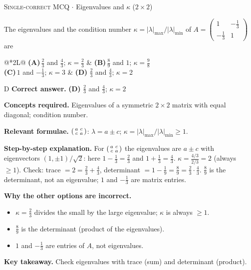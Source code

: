 \documentclass[11pt,a4paper]{article}
\newcommand{\optlabel}[1]{\textbf{(#1)}}
\newcommand{\correctlabel}[1]{\textcolor{okgreen}{\textbf{(#1)}\,\ding{51}}}
\newenvironment{qitem}[1]{\begin{list}{}{\setlength{\leftmargin}{3.3em}\setlength{\labelwidth}{3.1em}%
  \setlength{\labelsep}{0.2em}\setlength{\topsep}{3pt}\setlength{\parsep}{3pt}}\item[\textbf{Q.#1}\hfill]}{\end{list}}
\newcommand{\qsep}{\par\vspace{2pt}{\color{black!15}\hrule}\vspace{4pt}}
\newcommand{\qmeta}[2]{{\footnotesize\color{black!60}\textsc{#1} \;$\cdot$\; #2}\par}
\begin{document}
\begin{qitem}{2}
\qmeta{Single-correct MCQ}{Eigenvalues and $\kappa$ ($2\times2$)}
The eigenvalues and the condition number $\kappa = |\lambda|_{\max}/|\lambda|_{\min}$ of $A = \begin{pmatrix}1 & -\tfrac13\\ -\tfrac13 & 1\end{pmatrix}$ are
\par\smallskip\noindent\begin{tabularx}{\linewidth}{@{}*{2}{L}@{}}
\optlabel{A}\,$\tfrac23$ and $\tfrac43$; $\kappa = \tfrac23$ & \optlabel{B}\,$\tfrac89$ and $1$; $\kappa = \tfrac98$ \\[3pt]
\optlabel{C}\,$1$ and $-\tfrac13$; $\kappa = 3$ & \correctlabel{D}\,$\tfrac23$ and $\tfrac43$; $\kappa = 2$
\end{tabularx}
\end{qitem}
\begin{solbox}{D}
\textbf{\color{brand}Correct answer.} \textcolor{okgreen}{\textbf{(D)}} $\tfrac23$ and $\tfrac43$; $\kappa = 2$

\textbf{\color{brand}Concepts required.} Eigenvalues of a symmetric $2\times2$ matrix with equal diagonal; condition number.

\textbf{\color{brand}Relevant formulae.} $\begin{psmallmatrix}a&c\\c&a\end{psmallmatrix}$: $\lambda = a \pm c$; $\kappa = |\lambda|_{\max}/|\lambda|_{\min} \ge 1$.

\textbf{\color{brand}Step-by-step explanation.} For $\begin{psmallmatrix}a & c\\ c & a\end{psmallmatrix}$ the eigenvalues are $a \pm c$ with eigenvectors $(1, \pm1)/\sqrt2$: here $1 - \tfrac13 = \tfrac23$ and $1 + \tfrac13 = \tfrac43$.
$\kappa = \frac{4/3}{2/3} = 2$ (always $\ge 1$). Check: trace $= 2 = \tfrac23 + \tfrac43$, determinant $= 1 - \tfrac19 = \tfrac89 = \tfrac23\cdot\tfrac43$.
$\tfrac89$ is the determinant, not an eigenvalue; $1$ and $-\tfrac13$ are matrix entries.

\textbf{\color{brand}Why the other options are incorrect.}
\begin{itemize}[leftmargin=2.4em, itemsep=1pt, topsep=2pt]
\item[\textbf{(A)}] $\kappa = \frac23$ divides the small by the large eigenvalue; $\kappa$ is always $\ge 1$.
\item[\textbf{(B)}] $\frac89$ is the determinant (product of the eigenvalues).
\item[\textbf{(C)}] $1$ and $-\frac13$ are entries of $A$, not eigenvalues.
\end{itemize}
\textbf{\color{brand}Key takeaway.} Check eigenvalues with trace (sum) and determinant (product).
\end{solbox}
\qsep
\end{document}
